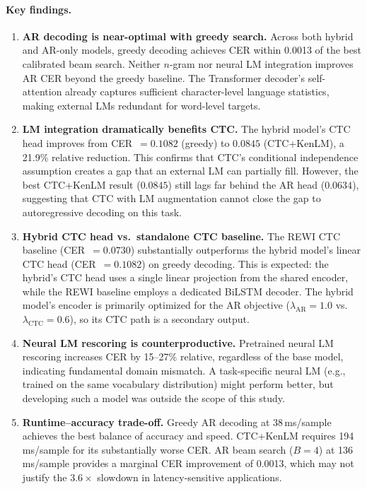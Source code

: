 \paragraph{Key findings.}
\begin{enumerate}
    \item \textbf{AR decoding is near-optimal with greedy search.}
    Across both hybrid and AR-only models, greedy decoding achieves CER within 0.0013 of the best calibrated beam search.
    Neither $n$-gram nor neural LM integration improves AR CER beyond the greedy baseline.
    The Transformer decoder's self-attention already captures sufficient character-level language statistics, making external LMs redundant for word-level targets.

    \item \textbf{LM integration dramatically benefits CTC.}
    The hybrid model's CTC head improves from CER~$=0.1082$ (greedy) to $0.0845$ (CTC+KenLM), a 21.9\% relative reduction.
    This confirms that CTC's conditional independence assumption creates a gap that an external LM can partially fill.
    However, the best CTC+KenLM result ($0.0845$) still lags far behind the AR head ($0.0634$), suggesting that CTC with LM augmentation cannot close the gap to autoregressive decoding on this task.

    \item \textbf{Hybrid CTC head vs.\ standalone CTC baseline.}
    The REWI CTC baseline (CER~$=0.0730$) substantially outperforms the hybrid model's linear CTC head (CER~$=0.1082$) on greedy decoding.
    This is expected: the hybrid's CTC head uses a single linear projection from the shared encoder, while the REWI baseline employs a dedicated BiLSTM decoder.
    The hybrid model's encoder is primarily optimized for the AR objective ($\lambda_\text{AR}\!=\!1.0$ vs.\ $\lambda_\text{CTC}\!=\!0.6$), so its CTC path is a secondary output.

    \item \textbf{Neural LM rescoring is counterproductive.}
    Pretrained neural LM rescoring increases CER by 15--27\% relative, regardless of the base model, indicating fundamental domain mismatch.
    A task-specific neural LM (e.g., trained on the same vocabulary distribution) might perform better, but developing such a model was outside the scope of this study.

    \item \textbf{Runtime--accuracy trade-off.}
    Greedy AR decoding at 38\,ms/sample achieves the best balance of accuracy and speed.
    CTC+KenLM requires 194\,ms/sample for its substantially worse CER.
    AR beam search ($B\!=\!4$) at 136\,ms/sample provides a marginal CER improvement of 0.0013, which may not justify the $3.6\times$ slowdown in latency-sensitive applications.
\end{enumerate}


